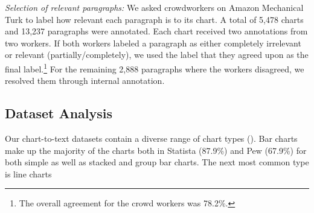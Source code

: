 \vspace{0.5em}
\noindent \Niii \textit{Selection of relevant paragraphs:} 
We asked crowdworkers on Amazon Mechanical Turk to label how relevant each paragraph is to its chart. 
A total of 5,478 charts and 13,237 paragraphs were annotated. Each chart received two annotations from two 
workers. If both workers labeled a paragraph as either completely irrelevant or relevant (partially/completely), we used the label that they agreed upon as the final label.\footnote{The overall agreement for the crowd workers was 78.2\%.} For  the remaining 2,888 paragraphs where the workers disagreed, we resolved them through internal annotation.



\subsection{Dataset Analysis}

Our chart-to-text datasets contain a diverse range of chart types (). Bar charts make up the majority of the charts both in Statista (87.9\%) and Pew (67.9\%) for both simple as well as stacked and group bar charts. The next most common type is line charts

\begin{table}[t]
\centering
\small 
{}

\caption{Chart type distribution.}

\label{dataset-chart-types}

\end{table}



